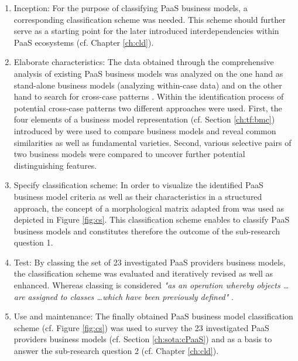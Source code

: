 \begin{enumerate}
	\item Inception: For the purpose of classifying \ac{PaaS} business models, a corresponding classification scheme was needed. This scheme should further serve as a starting point for the later introduced interdependencies within \ac{PaaS} ecosystems (cf. Chapter \ref{ch:cld}).

	\item Elaborate characteristics: The data obtained through the comprehensive analysis of existing \ac{PaaS} business models was analyzed on the one hand as stand-alone business models (analyzing within-case data) and on the other hand to search for cross-case patterns \citep[pp. 539-540]{Eisenhardt1989}. Within the identification process of potential cross-case patterns two different approaches were used. First, the four elements of a business model representation (cf. Section \ref{ch:tf:bmc}) introduced by \citet{Johnson2008} were used to compare business models and reveal common similarities as well as fundamental varieties. Second, various selective pairs of two business models were compared to uncover further potential distinguishing features. 

	\item Specify classification scheme: In order to visualize the identified \ac{PaaS} business model criteria as well as their characteristics in a structured approach, the concept of a morphological matrix adapted from \citet{ Zwicky1969} was used as depicted in Figure \ref{fig:cs}. This classification scheme enables to classify \ac{PaaS} business models and constitutes therefore the outcome of the sub-research question 1.

	\item Test: By classing the set of 23 investigated \ac{PaaS} providers business models, the classification scheme was evaluated and iteratively revised as well as enhanced. Whereas classing is considered \textit{"as an operation whereby objects \ldots are assigned to classes \ldots which have been previously defined"} \citep[p. 130]{Marradi1990}.

	\item Use and maintenance: The finally obtained \ac{PaaS} business model classification scheme (cf. Figure \ref{fig:cs}) was used to survey the 23 investigated \ac{PaaS} providers business models (cf. Section \ref{ch:sota:cPaaS}) and as a basis to answer the sub-research question 2 (cf. Chapter \ref{ch:cld}).
\end{enumerate}

